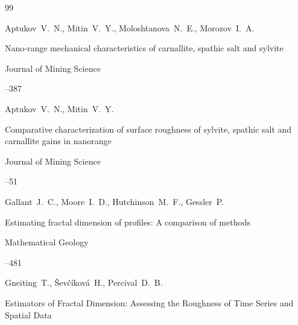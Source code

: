 \begin{thebibliography}{99}






\by Aptukov~V.~N., Mitin~V.~Y., Moloshtanova~N.~E., Morozov~I.~A.

\paper Nano-range mechanical characteristics of carnallite, spathic salt and sylvite

\jour Journal of Mining Science 




--387






\by Aptukov~V.~N., Mitin~V.~Y.

\paper Comparative characterization of surface roughness of sylvite, spathic salt and carnallite gains in nanorange

\jour Journal of Mining Science 




--51






\by     Gallant~J.~C., Moore~I.~D.,  Hutchinson~M.~F., Gessler~P.

\paper Estimating fractal dimension of profiles: A comparison of methods

\jour Mathematical Geology




--481







\by Gneiting~T.,  Ševčíková~H., Percival~D.~B. 

\paper Estimators of Fractal Dimension: Assessing the Roughness of Time Series and Spatial Data


\end{thebibliography}

